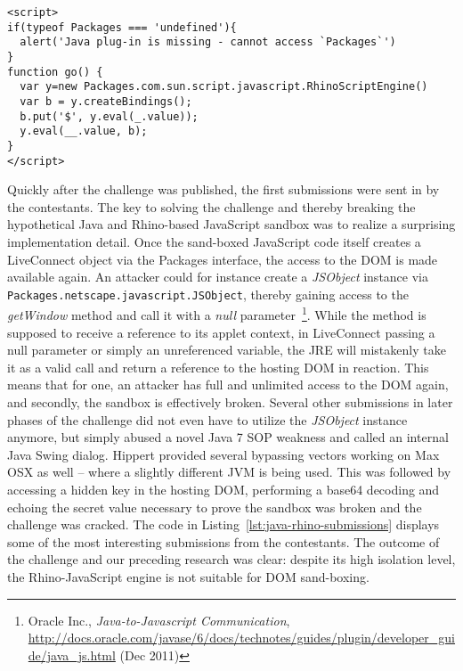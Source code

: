 \begin{lstlisting}[captionpos=b,caption=Java Rhinos XSS challenge testbed; Two given injection points were made available for the contestants -- one using bindings,label=lst:java-rhino-testbed]
<script>
if(typeof Packages === 'undefined'){
  alert('Java plug-in is missing - cannot access `Packages`')
}
function go() {
  var y=new Packages.com.sun.script.javascript.RhinoScriptEngine()
  var b = y.createBindings();
  b.put('$', y.eval(_.value));
  y.eval(__.value, b);
}
</script>
\end{lstlisting}

   Quickly after the challenge was published, the first submissions were sent in by the contestants. The key to solving the challenge and thereby breaking the hypothetical Java and Rhino-based JavaScript sandbox was to realize a surprising implementation detail. Once the sand-boxed JavaScript code itself creates a LiveConnect object via the Packages interface, the access to the DOM is made available again. An attacker could for instance create a \textit{JSObject} instance via \texttt{Packages.netscape.javascript.JSObject}, thereby gaining access to the \textit{getWindow} method and call it with a \textit{null} parameter~\footnote{Oracle Inc., \textit{Java-to-Javascript Communication}, \url{http://docs.oracle.com/javase/6/docs/technotes/guides/plugin/developer_guide/java_js.html} (Dec 2011)}. While the method is supposed to receive a reference to its applet context, in LiveConnect passing a null parameter or simply an unreferenced variable, the JRE will mistakenly take it as a valid call and return a 
reference to the hosting DOM in reaction. This means that for one, an attacker has full and unlimited access to the DOM again, and secondly, the sandbox is effectively broken. Several other submissions in later phases of the challenge did not even have to utilize the \textit{JSObject} instance anymore, but simply abused a novel Java 7 SOP weakness and called an internal Java Swing dialog. Hippert provided several bypassing vectors working on Max OSX as well -- where a slightly different JVM is being used. This was followed by accessing a hidden key in the hosting DOM, performing a base64 decoding and echoing the secret value necessary to prove the sandbox was broken and the challenge was cracked. The code in Listing~\ref{lst:java-rhino-submissions} displays some of the most interesting submissions from the contestants. The outcome of the challenge and our preceding research was clear: despite its high isolation level, the Rhino-JavaScript engine is not suitable for DOM sand-boxing.

